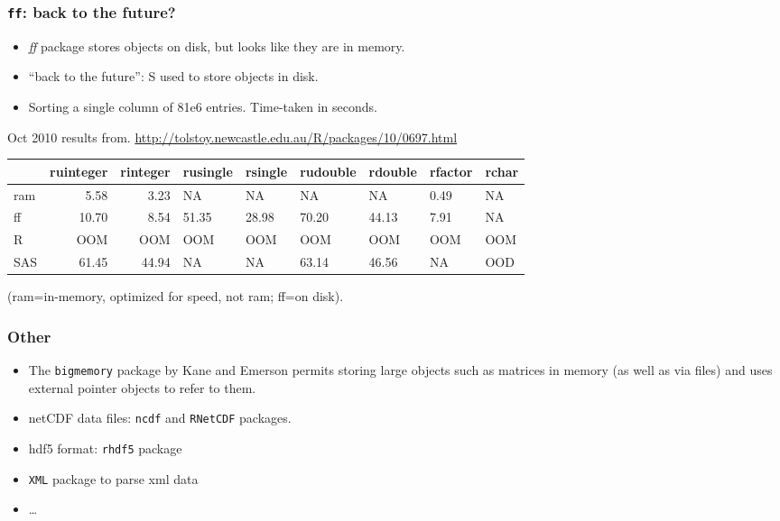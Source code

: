 \documentclass{beamer}
\begin{document}
\begin{frame}
\frametitle{\texttt{ff}: back to the future?}
\label{sec-4-8}


\begin{itemize}
\item \emph{ff} package stores objects on disk, but looks like they are in
   memory.
\item ``back to the future'': S used to store objects in disk.
\item Sorting a single column of 81e6 entries.  Time-taken in seconds.
\end{itemize}

Oct 2010 results from.
\href{http://tolstoy.newcastle.edu.au/R/packages/10/0697.html}{http://tolstoy.newcastle.edu.au/R/packages/10/0697.html}



\begin{center}
\begin{tabular}{lrrllllll}
\hline
      &  ruinteger  &  rinteger  &  rusingle  &  rsingle  &  rudouble  &  rdouble  &  rfactor  &  rchar  \\
\hline
 ram  &       5.58  &      3.23  &  NA        &  NA       &  NA        &  NA       &  0.49     &  NA     \\
 ff   &      10.70  &      8.54  &  51.35     &  28.98    &  70.20     &  44.13    &  7.91     &  NA     \\
 R    &        OOM  &       OOM  &  OOM       &  OOM      &  OOM       &  OOM      &  OOM      &  OOM    \\
 SAS  &      61.45  &     44.94  &  NA        &  NA       &  63.14     &  46.56    &  NA       &  OOD    \\
\hline
\end{tabular}
\end{center}



(ram=in-memory, optimized for speed, not ram; ff=on disk).

\end{frame}
\begin{frame}
\frametitle{Other}
\label{sec-4-9}


\begin{itemize}
\item The \texttt{bigmemory} package by Kane and Emerson permits storing large objects such as matrices in memory (as well as via files) and uses external pointer objects to refer to them.
\item netCDF data files: \texttt{ncdf} and \texttt{RNetCDF} packages.
\item hdf5 format: \texttt{rhdf5} package
\item \texttt{XML} package to parse xml data
\item \ldots{}
\end{itemize}
\end{frame}
\end{document}
